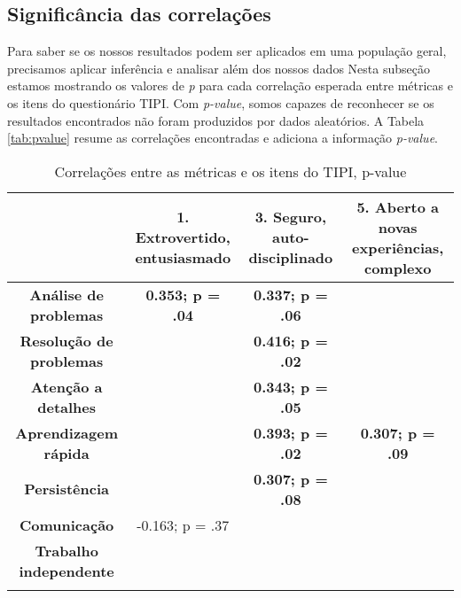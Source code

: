 \subsection{Significância das correlações}

Para saber se os nossos resultados podem ser aplicados em uma população geral, precisamos aplicar inferência e analisar além dos nossos dados
Nesta subseção estamos mostrando os valores de \textit{p} para cada correlação esperada entre métricas e os itens do questionário TIPI.
Com \textit{p-value}, somos capazes de reconhecer se os resultados encontrados não foram produzidos por dados aleatórios.
A Tabela \ref{tab:pvalue} resume as correlações encontradas e adiciona a informação \textit{p-value}.

\begin{sidewaystable}[ph!]
\footnotesize
\caption{\small Correlações entre as métricas e os itens do TIPI, p-value}
\addtolength{\tabcolsep}{1pt}
\centering
\begin{tabular}{lccc}

    \toprule
          & \textbf{1. Extrovertido, entusiasmado} & \textbf{3. Seguro, auto-disciplinado} & \textbf{5. Aberto a novas experiências, complexo} \\
    \midrule
    \multicolumn{1}{c}{\textbf{Análise de problemas}} 	& \textbf{0.353; p = .04} & \textbf{0.337; p = .06} & \textbf{} \\
    \multicolumn{1}{c}{\textbf{Resolução de problemas}} &													& \textbf{0.416; p = .02} & \textbf{} \\
    \multicolumn{1}{c}{\textbf{Atenção a detalhes}} 		&													& \textbf{0.343; p = .05} &  \\
    \multicolumn{1}{c}{\textbf{Aprendizagem rápida}} 		&													& \textbf{0.393; p = .02} & \textbf{0.307; p = .09} \\
    \multicolumn{1}{c}{\textbf{Persistência}} 					&													& \textbf{0.307; p = .08} &  \\
    \multicolumn{1}{c}{\textbf{Comunicação}} 						& -0.163; p = .37					&													&  \\
    \multicolumn{1}{c}{\textbf{Trabalho independente}} 	&													&													&  \\
		
          &  &  &  \\


\end{tabular}
\end{sidewaystable}
